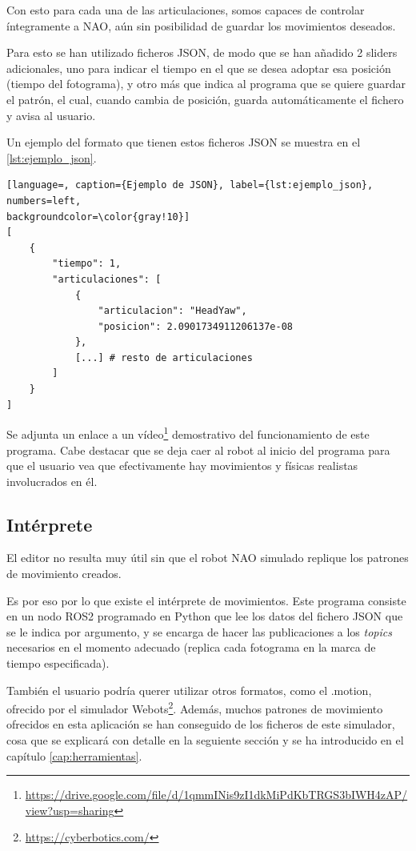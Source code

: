 Con esto para cada una de las articulaciones, somos capaces de controlar íntegramente a NAO, aún sin posibilidad de guardar los movimientos deseados.

Para esto se han utilizado ficheros JSON, de modo que se han añadido 2 sliders adicionales, uno para indicar el tiempo en el que se desea adoptar esa posición (tiempo del fotograma), y otro más que indica al programa que se quiere guardar el patrón, el cual, cuando cambia de posición, guarda automáticamente el fichero y avisa al usuario.

Un ejemplo del formato que tienen estos ficheros JSON se muestra en el \autoref{lst:ejemplo_json}.

\begin{lstlisting}[language=, caption={Ejemplo de JSON}, label={lst:ejemplo_json}, numbers=left, 
backgroundcolor=\color{gray!10}]    
[
    {
        "tiempo": 1,
        "articulaciones": [
            {
                "articulacion": "HeadYaw",
                "posicion": 2.0901734911206137e-08
            },
            [...] # resto de articulaciones
        ]
    }
]
\end{lstlisting}

Se adjunta un enlace a un vídeo\footnote{\url{https://drive.google.com/file/d/1qmmINis9zI1dkMiPdKbTRGS3bIWH4zAP/view?usp=sharing}} demostrativo del funcionamiento de este programa. Cabe destacar que se deja caer al robot al inicio del programa para que el usuario vea que efectivamente hay movimientos y físicas realistas involucrados en él.

\subsection{Intérprete} \label{subsec:interprete}

El editor no resulta muy útil sin que el robot NAO simulado replique los patrones de movimiento creados.

Es por eso por lo que existe el intérprete de movimientos. Este programa consiste en un nodo ROS2 programado en Python que lee los datos del fichero JSON que se le indica por argumento, y se encarga de hacer las publicaciones a los \textit{topics} necesarios en el momento adecuado (replica cada fotograma en la marca de tiempo especificada).

También el usuario podría querer utilizar otros formatos, como el .motion, ofrecido por el simulador Webots\footnote{\url{https://cyberbotics.com/}}. Además, muchos patrones de movimiento ofrecidos en esta aplicación se han conseguido de los ficheros de este simulador, cosa que se explicará con detalle en la seguiente sección y se ha introducido en el capítulo \ref{cap:herramientas}.

